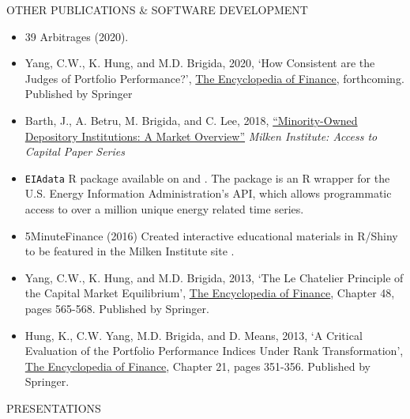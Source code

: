 \documentclass[9pt]{article}
\begin{document}
\vspace{10pt}
OTHER PUBLICATIONS \& SOFTWARE DEVELOPMENT
\begin{itemize}[noitemsep, nolistsep]
\item 39 Arbitrages (2020).
\item Yang, C.W., K. Hung, and M.D. Brigida, 2020, `How Consistent are the Judges of Portfolio Performance?', \underline{The Encyclopedia of Finance}, forthcoming.  Published by Springer
\item Barth, J., A. Betru, M. Brigida, and C. Lee, 2018, \href{https://assets1b.milkeninstitute.org/assets/Publication/ResearchReport/PDF/MDIs-A-Market-Overview-7.18.18-FINAL.pdf}{\color{Blue}``Minority-Owned Depository Institutions: A Market Overview''} {\it Milken Institute: Access to Capital Paper Series}
\item \texttt{EIAdata} R package available on \href{http://cran.r-project.org/package=EIAdata}{\color{Blue}{CRAN (stable)}} and \href{https://github.com/Matt-Brigida/EIAdata}{\color{Blue}{Github (development)}}.  The package is an R wrapper for the U.S. Energy Information Administration's API, which allows programmatic access to over a million unique energy related time series.
\item 5MinuteFinance (2016) Created interactive educational materials in R/Shiny to be featured in the Milken Institute site {\color{blue}{5MinuteFinance.org}}. 
\item Yang, C.W., K. Hung, and M.D. Brigida, 2013, `The Le Chatelier Principle of the Capital Market Equilibrium', \underline{The
Encyclopedia of Finance}, Chapter 48, pages 565-568. Published by Springer.
\item Hung, K., C.W. Yang, M.D. Brigida, and D. Means, 2013, `A Critical Evaluation of the Portfolio Performance
Indices Under Rank Transformation', \underline{The Encyclopedia of Finance}, Chapter 21, pages 351-356. Published by
Springer.
\end{itemize}
\vspace{10pt}
PRESENTATIONS
\end{document}
